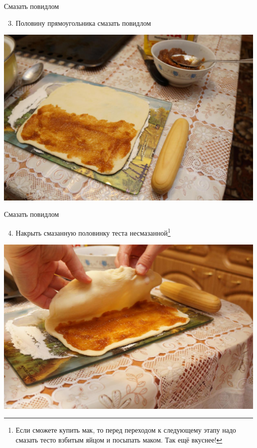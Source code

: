 \documentclass[usenames,dvipsnames,pdftex,unicode,hidelinks]{beamer}
\newcommand{\operation}[2]{
    \begin{enumerate}
        \setcounter{enumi}{#1}
      \item #2
    \end{enumerate}
  }
\begin{document}
  \begin{frame}{Смазать повидлом}
    \begin{center}
      \operation{2}{\alert{Половину} прямоугольника смазать повидлом}

      \includegraphics[height=0.7\textheight]{jam}
    \end{center}
  \end{frame}

  \begin{frame}{Смазать повидлом}
    \begin{center}
      \operation{3}{Накрыть смазанную половинку теста несмазанной\footnote{
        Если сможете купить мак, то перед переходом к следующему этапу надо
        смазать тесто взбитым яйцом и посыпать маком. Так ещё вкуснее!
      }}

      \includegraphics[height=0.62\textheight]{fold}
    \end{center}
  \end{frame}
\end{document}
